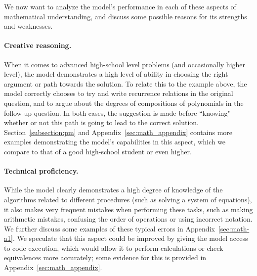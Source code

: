 We now want to analyze the model's performance in each of these aspects of mathematical understanding, and discuss some possible reasons for its strengths and weaknesses.

\paragraph{Creative reasoning.} When it comes to advanced high-school level problems (and occasionally higher level), the model demonstrates a high level of ability in choosing the right argument or path towards the solution. To relate this to the example above, the model correctly chooses to try and write recurrence relations in the original question, and to argue about the degrees of compositions of polynomials in the follow-up question. In both cases, the suggestion is made before ``knowing" whether or not this path is going to lead to the correct solution. Section~\ref{subsection:pm} and Appendix~\ref{sec:math_appendix} contains more examples demonstrating the model's capabilities in this aspect, which we compare to that of a good high-school student or even higher.

\paragraph{Technical proficiency.} While the model clearly demonstrates a high degree of knowledge of the algorithms related to different procedures (such as solving a system of equations), it also makes very frequent mistakes when performing these tasks, such as making arithmetic mistakes, confusing the order of operations or using incorrect notation. We further discuss some examples of these typical errors in Appendix~\ref{sec:math-a1}. We speculate that this aspect could be improved by giving the model access to code execution, which would allow it to perform calculations or check equivalences more accurately; some evidence for this is provided in Appendix~\ref{sec:math_appendix}.

